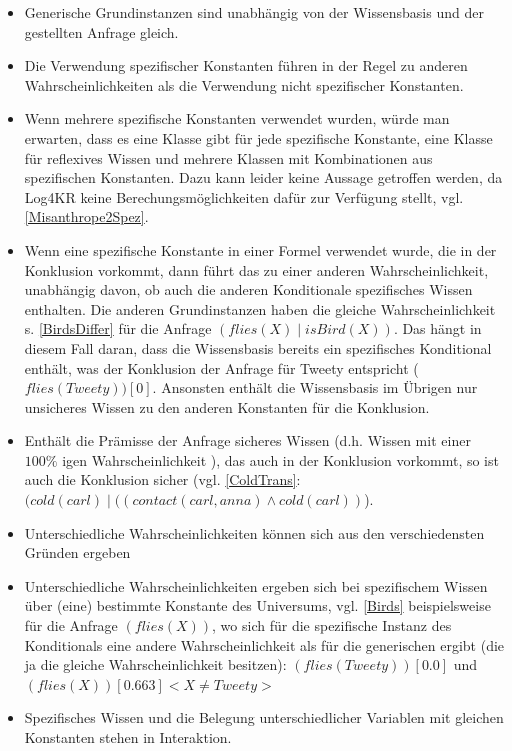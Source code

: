 \documentclass[draft]{scrreprt}
\begin{document}
\begin{itemize}
	\item 	Generische Grundinstanzen  sind unabhängig von der Wissensbasis und der gestellten Anfrage gleich.
	\item Die Verwendung spezifischer Konstanten   führen in der Regel zu anderen Wahrscheinlichkeiten als die Verwendung nicht spezifischer Konstanten.
	\item Wenn mehrere spezifische Konstanten verwendet wurden, würde man erwarten, dass es eine Klasse gibt für jede spezifische Konstante, eine Klasse für reflexives Wissen und mehrere Klassen mit Kombinationen aus spezifischen Konstanten. Dazu kann leider keine Aussage getroffen werden, da Log4KR keine Berechungsmöglichkeiten dafür zur Verfügung stellt, vgl.  \ref{Misanthrope2Spez}.
	\item Wenn eine spezifische Konstante in einer Formel verwendet wurde, die in der Konklusion vorkommt, dann führt das zu einer anderen Wahrscheinlichkeit, unabhängig davon, ob auch die anderen Konditionale spezifisches Wissen enthalten. Die anderen Grundinstanzen haben die gleiche Wahrscheinlichkeit s. \ref{BirdsDiffer} für die Anfrage $ (flies(X) \mid isBird(X))$. Das hängt in diesem Fall daran, dass die Wissensbasis bereits ein spezifisches Konditional enthält, was der Konklusion der Anfrage für Tweety entspricht ($ flies(Tweety))[0] $. Ansonsten enthält die Wissensbasis im Übrigen nur unsicheres Wissen zu den anderen Konstanten für die Konklusion.
	\item Enthält die Prämisse der Anfrage sicheres Wissen (d.h. Wissen mit einer $ 100 \%  $ igen Wahrscheinlichkeit ), das auch in der Konklusion vorkommt, so ist auch die Konklusion sicher (vgl. \ref{ColdTrans}:$(cold(carl) \mid ((contact(carl,anna)  \land cold(carl)) $). 
	\item Unterschiedliche Wahrscheinlichkeiten können sich aus den verschiedensten Gründen ergeben
	\item Unterschiedliche Wahrscheinlichkeiten ergeben sich bei spezifischem Wissen über (eine) bestimmte Konstante des Universums, vgl. \ref{Birds} beispielsweise für die Anfrage $ (flies(X)) $, wo sich für die spezifische Instanz des Konditionals eine andere Wahrscheinlichkeit als für die generischen ergibt (die ja die gleiche Wahrscheinlichkeit besitzen): $ (flies(Tweety))[0.0] $ und $ (flies(X))[0.663]<X \neq Tweety> $
	\item Spezifisches Wissen und die Belegung unterschiedlicher Variablen mit gleichen Konstanten stehen in Interaktion.

\end{itemize}
\end{document}
